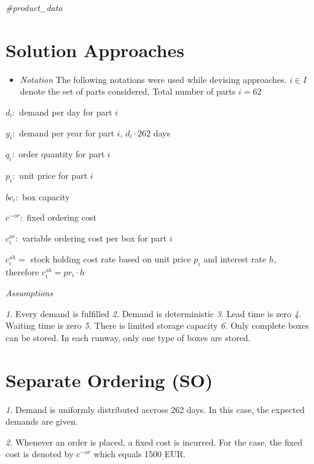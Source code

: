 \documentclass[
]{article}
\newenvironment{Shaded}{\begin{snugshade}}{\end{snugshade}}
\newcommand{\CommentTok}[1]{\textcolor[rgb]{0.56,0.35,0.01}{\textit{#1}}}
\providecommand{\tightlist}{%
  \setlength{\itemsep}{0pt}\setlength{\parskip}{0pt}}
\begin{document}
\begin{Shaded}
\begin{Highlighting}[]
\CommentTok{#product_data}
\end{Highlighting}
\end{Shaded}

\hypertarget{solution-approaches}{%
\section{Solution Approaches}\label{solution-approaches}}

\begin{itemize}
\tightlist
\item
  \emph{Notation} The following notations were used while devising
  approaches. \(i \in I\) denote the set of parts considered, Total
  number of parts \(i=62\)
\end{itemize}

\(d_i :\) demand per day for part \(i\)

\(y_i :\) demand per year for part \(i\), \(d_i \cdot 262\) days

\(q_i :\) order quantity for part \(i\)

\(p_i :\) unit price for part \(i\)

\(bc_i :\) box capacity

\(c^{-or} :\) fixed ordering cost

\(c^{or}_i :\) variable ordering cost per box for part \(i\)

\(c_i^{sh}=\) stock holding cost rate based on unit price \(p_i\) and
interest rate \(h, \qquad\) therefore \(c_i^{sh}=pr_i \cdot h\)

\emph{Assumptions}

\emph{1.} Every demand is fulfilled \emph{2.} Demand is deterministic
\emph{3.} Lead time is zero \emph{4.} Waiting time is zero \emph{5.}
There is limited storage capacity \emph{6.} Only complete boxes can be
stored. In each runway, only one type of boxes are stored.

\hypertarget{separate-ordering-so}{%
\section{Separate Ordering (SO)}\label{separate-ordering-so}}

\emph{1.} Demand is uniformly distributed accross 262 days. In this
case, the expected demands are given.

\emph{2.} Whenever an order is placed, a fixed cost is incurred. For the
case, the fixed cost is denoted by \(c^{-or}\) which equals 1500 EUR.
\end{document}
